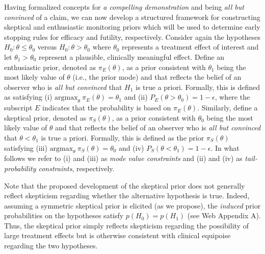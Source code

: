 \documentclass[useAMS,usenatbib,referee]{biom}
\begin{document}
Having formalized concepts for \textit{a compelling demonstration} and  being \textit{all but convinced} of a claim, we can now develop a structured framework for constructing skeptical and enthusiastic monitoring priors which will be used to determine early stopping rules for efficacy and futility, respectively.
%
Consider again the hypotheses $H_0: \theta \le \theta_0$ versus $H_0: \theta > \theta_0$ where $\theta_0$ represents a 
treatment effect of interest and let $\theta_1>\theta_0$ represent a plausible, clinically meaningful effect.
%
Define an enthusiastic prior, denoted as $\pi_{E}(\theta)$, as a prior consistent with $\theta_1$ being the most 
likely value of $\theta$ (i.e., the prior mode) and that reflects the belief of an observer who is 
\textit{all but convinced} that $H_1$ is true a priori. 
%
Formally, this is defined as satisfying (i) $\text{argmax}_\theta~\pi_E(\theta)=\theta_1$
and (ii) $P_E(\theta >\theta_0)=1-\epsilon$, where the subscript $E$ indicates that the probability is 
based on $\pi_{E}(\theta)$.
%
Similarly, define a skeptical prior, denoted as $\pi_{S}(\theta)$, as a prior consistent with $\theta_0$ being the most 
likely value of $\theta$ and that reflects the belief of an observer who is \textit{all but convinced} that 
$\theta <\theta_1$ is true a priori. 
%
Formally, this is defined as the prior $\pi_{S}(\theta)$ satisfying
(iii) $\text{argmax}_\theta~\pi_S(\theta)=\theta_0$  and (iv) $P_S(\theta <\theta_1)=1-\epsilon$.
%
In what follows we refer to (i) and (iii) as \textit{mode value constraints} and (ii) and (iv) as \textit{tail-probability constraints}, respectively.

Note that the proposed development of the skeptical prior does not generally reflect skepticism regarding whether the alternative hypothesis is true. 
%
Indeed, assuming a symmetric skeptical prior is elicited (as we propose), the \textit{induced} prior probabilities on the hypotheses
satisfy $p(H_0) =  p(H_1)$ (see Web Appendix A).
%
%
%
Thus, the skeptical prior simply reflects skepticism regarding the possibility of large treatment effects but is
otherwise consistent with clinical equipoise regarding the two hypotheses.
%
\end{document}
